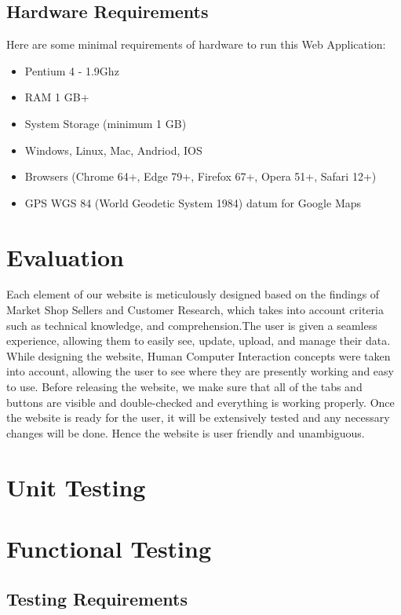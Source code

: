 \subsection{Hardware Requirements}
Here are some minimal requirements of hardware to run this Web Application:
\begin{itemize}
	\item Pentium 4 - 1.9Ghz  
	\item RAM 1 GB+ 
	\item System Storage (minimum 1 GB)
	\item Windows, Linux, Mac, Andriod, IOS
	\item Browsers (Chrome 64+, Edge 79+, Firefox 67+, Opera 51+, Safari 12+)
	\item GPS WGS 84 (World Geodetic System 1984) datum for Google Maps 
\end{itemize}


\section{Evaluation}
Each element of our website is meticulously designed based on the findings of Market Shop Sellers and Customer Research, which takes into account criteria such as technical knowledge, and comprehension.The user is given a seamless experience, allowing them to easily see, update, upload, and manage their data. While designing the website, Human Computer Interaction concepts were taken into account, allowing the user to see where they are presently working and easy to use. Before releasing the website, we make sure that all of the tabs and buttons are visible and double-checked and everything is working properly. Once the website is ready for the user, it will be extensively tested and any necessary changes will be done. Hence the website is user friendly and unambiguous.
\section{Unit Testing}
\section{Functional Testing}
\subsection{Testing Requirements}
